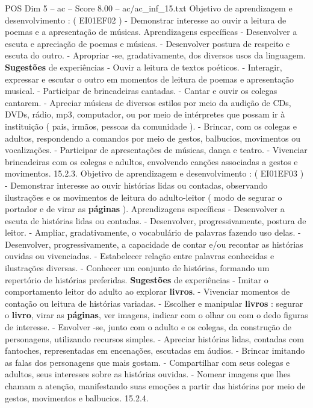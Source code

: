 \begin{textsample}{POS Dim 5 – ac – Score 8.00 – ac/ac\_inf\_15.txt}
Objetivo de aprendizagem e desenvolvimento : ( EI01EF02 ) - Demonstrar interesse ao ouvir a leitura de poemas e a apresentação de músicas.
Aprendizagens específicas - Desenvolver a escuta e apreciação de poemas e músicas. - Desenvolver postura de respeito e escuta do outro. - Apropriar -se, gradativamente, dos diversos usos da linguagem. \textbf{Sugestões} de experiências - Ouvir a leitura de textos poéticos. - Interagir, expressar e escutar o outro em momentos de leitura de poemas e apresentação musical. - Participar de brincadeiras cantadas. - Cantar e ouvir os colegas cantarem. - Apreciar músicas de diversos estilos por meio da audição de CDs, DVDs, rádio, mp3, computador, ou por meio de intérpretes que possam ir à instituição ( pais, irmãos, pessoas da comunidade ). - Brincar, com os colegas e adultos, respondendo a comandos por meio de gestos, balbucios, movimentos ou vocalizações. - Participar de apresentações de músicas, dança e teatro. - Vivenciar brincadeiras com os colegas e adultos, envolvendo canções associadas a gestos e movimentos. 15.2.3.
Objetivo de aprendizagem e desenvolvimento : ( EI01EF03 ) - Demonstrar interesse ao ouvir histórias lidas ou contadas, observando ilustrações e os movimentos de leitura do adulto-leitor ( modo de segurar o portador e de virar as \textbf{páginas} ).
Aprendizagens específicas - Desenvolver a escuta de histórias lidas ou contadas. - Desenvolver, progressivamente, postura de leitor. - Ampliar, gradativamente, o vocabulário de palavras fazendo uso delas. - Desenvolver, progressivamente, a capacidade de contar e/ou recontar as histórias ouvidas ou vivenciadas. - Estabelecer relação entre palavras conhecidas e ilustrações diversas. - Conhecer um conjunto de histórias, formando um repertório de histórias preferidas. \textbf{Sugestões} de experiências - Imitar o comportamento leitor do adulto ao explorar \textbf{livros}. - Vivenciar momentos de contação ou leitura de histórias variadas. - Escolher e manipular \textbf{livros} : segurar o \textbf{livro}, virar as \textbf{páginas}, ver imagens, indicar com o olhar ou com o dedo figuras de interesse. - Envolver -se, junto com o adulto e os colegas, da construção de personagens, utilizando recursos simples. - Apreciar histórias lidas, contadas com fantoches, representadas em encenações, escutadas em áudios. - Brincar imitando as falas dos personagens que mais gostam. - Compartilhar com seus colegas e adultos, seus interesses sobre as histórias ouvidas. - Nomear imagens que lhes chamam a atenção, manifestando suas emoções a partir das histórias por meio de gestos, movimentos e balbucios. 15.2.4.

\end{textsample}
